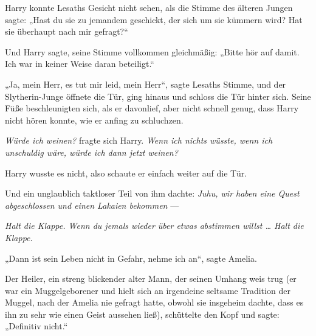 Harry konnte Lesaths Gesicht nicht sehen, als die Stimme des älteren Jungen sagte:
„Hast du sie zu jemandem geschickt, der sich um sie kümmern wird? Hat sie überhaupt nach mir gefragt?“

Und Harry sagte, seine Stimme vollkommen gleichmäßig:
„Bitte hör auf damit. Ich war in keiner Weise daran beteiligt.“

„Ja, mein Herr, es tut mir leid, mein Herr“, sagte Lesaths Stimme, und der Slytherin-Junge öffnete die Tür, ging hinaus und schloss die Tür hinter sich. Seine Füße beschleunigten sich, als er davonlief, aber nicht schnell genug, dass Harry nicht hören konnte, wie er anfing zu schluchzen.

\emph{Würde ich weinen?} fragte sich Harry. \emph{Wenn ich nichts wüsste, wenn ich unschuldig wäre, würde ich dann jetzt weinen?}

Harry wusste es nicht, also schaute er einfach weiter auf die Tür.

Und ein unglaublich taktloser Teil von ihm dachte: \emph{Juhu, wir haben eine Quest abgeschlossen und einen Lakaien bekommen} —

\emph{Halt die Klappe. Wenn du jemals wieder über etwas abstimmen willst … Halt die Klappe.}


„Dann ist sein Leben nicht in Gefahr, nehme ich an“, sagte Amelia.

Der Heiler, ein streng blickender alter Mann, der seinen Umhang weis trug (er war ein Muggelgeborener und hielt sich an irgendeine seltsame Tradition der Muggel, nach der Amelia nie gefragt hatte, obwohl sie insgeheim dachte, dass es ihn zu sehr wie einen Geist aussehen ließ), schüttelte den Kopf und sagte:
„Definitiv nicht.“

